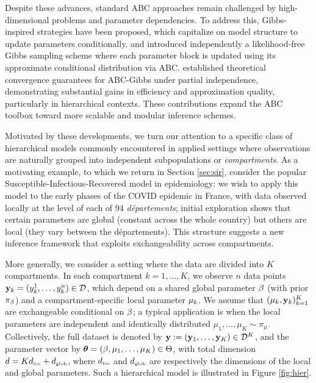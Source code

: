 Despite these advances, standard ABC approaches remain challenged by high-dimensional problems and parameter dependencies. To address this, Gibbs-inspired strategies have been proposed, which capitalize on model structure to update parameters conditionally. \citet{clarte2021componentwise} and \citet{rodrigues2020likelihood} introduced independently a likelihood-free Gibbs sampling scheme where each parameter block is updated using its approximate conditional distribution via ABC. 
\citet{clarte2021componentwise} established theoretical convergence guarantees for ABC-Gibbs under partial independence, demonstrating substantial gains in efficiency and approximation quality, particularly in hierarchical contexts. These contributions expand the ABC toolbox toward more scalable and modular inference schemes.

Motivated by these developments, we turn our attention to a specific class of hierarchical models commonly encountered in applied settings where observations are naturally grouped into independent subpopulations or \emph{compartments}. 
As a motivating example, to which we return in Section \ref{sec:sir}, consider the popular Susceptible-Infectious-Recovered model in epidemiology: we wish to apply this model to the early phases of the COVID epidemic in France, with data observed locally at the level of each of $94$ \emph{d\'epartements}; initial exploration shows that certain parameters are global (constant across the whole country) but others are local (they vary between the départements).   
This structure suggests a new inference framework that exploits exchangeability across compartments.

More generally, we consider a setting where the data are divided into $K$ compartments. In each compartment $k = 1, \dots, K$, we observe $n$ data points $\mathbf{y}_k = (y_k^1, \dots, y_k^n) \in \mathcal{D}$, which depend on a shared global parameter $\beta$ (with prior $\pi_\beta$) and a compartment-specific local parameter $\mu_k$. We assume that $(\mu_k, \mathbf{y}_k)_{k=1}^K$ are exchangeable conditional on $\beta$; a typical application is when the local parameters are independent and identically distributed $\mu_1,\ldots,\mu_K\sim\pi_\mu$. Collectively, the full dataset is denoted by $\mathbf{y} := (\mathbf{y}_1, \dots, \mathbf{y}_K) \in \mathcal{D}^K$, and the parameter vector by $\boldsymbol{\theta} = (\beta, \mu_{1}, \dots, \mu_{K}) \in \Theta$, with total dimension $d = Kd_{\mathrm{\scriptscriptstyle loc}} + d_{\mathrm{\scriptscriptstyle glob}}$, where $d_{\mathrm{\scriptscriptstyle loc}}$ and $d_{\mathrm{\scriptscriptstyle glob}}$ are respectively the dimensions of the local and global parameters. 
Such a hierarchical model is illustrated in Figure \ref{fig:hier}.

